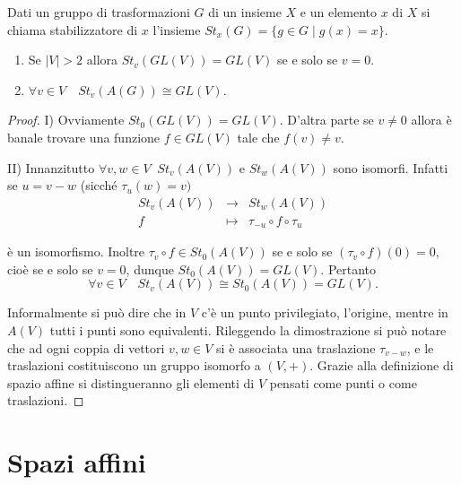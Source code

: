  \vspace{0.5cm}
 
 \begin{definition}
 Dati un gruppo di trasformazioni $G$ di un insieme $X$ e un elemento $x$ di
 $X$ si chiama stabilizzatore di $x$ l'insieme $St_x(G)=\{g\in G\;|\; g(x)=x\}$.
 \end{definition}
 
 \begin{proposition}
 \begin{enumerate}[label=\Roman*)]
	 \item Se $|V|>2$ allora $St_v(GL(V))=GL(V)$ se e solo se $v=0$.
	 \item $\forall v\in V\quad St_v(A(G))\cong GL(V)$.
	\end{enumerate} 
 \end{proposition}
 
 \begin{proof}
 I) Ovviamente $St_0(GL(V))=GL(V).$
 D'altra parte se $v\ne 0$ allora è banale trovare una funzione $f\in GL(V)$ tale che $f(v)\ne v.$
  
 
 II) Innanzitutto $\forall v,w\in V\;\; St_v(A(V))$ e $St_w(A(V))$ sono isomorfi.
 Infatti se
 $u=v-w$ (sicché $\tau_u(w)=v)$
 \begin{eqnarray*}
	St_v(A(V)) &\to & St_w(A(V)) \\
	f &\mapsto & \tau_{-u}\circ f\circ\tau_u
 \end{eqnarray*}
 
 è un isomorfismo.
 Inoltre $\tau_v\circ f\in St_0(A(V))$ se e solo se $(\tau_v\circ f)(0)=0,$ cioè se e solo se $v=0$,
 dunque $St_0(A(V))=GL(V)$.
 Pertanto $$\forall v\in V\quad St_v(A(V))\cong St_0(A(V))=GL(V).$$
 
 
 
 Informalmente si può dire che in $V$ c'è un punto privilegiato, l'origine, mentre in $A(V)$
 tutti i punti sono equivalenti.
 Rileggendo la dimostrazione si può notare che ad ogni coppia di vettori $v,w\in V$ si è associata una traslazione
 $\tau_{v-w}$, e le traslazioni costituiscono un gruppo isomorfo a $(V,+)$.
 Grazie alla definizione di spazio affine si distingueranno gli elementi di $V$ pensati come punti o come traslazioni.
 \end{proof}
 
	\section{Spazi affini}
 
